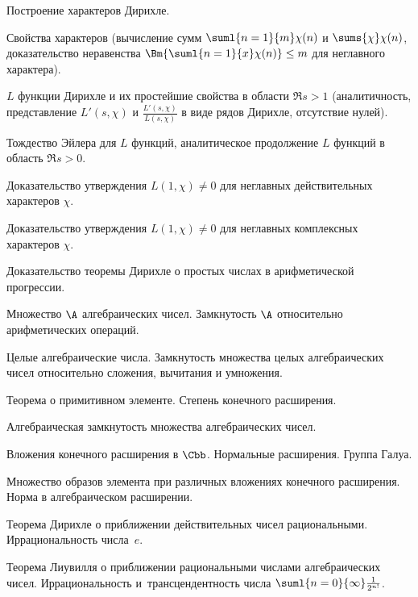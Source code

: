 \documentclass[a4paper]{article}
\begin{document}
\begin{nums}{-3.2}
\item Построение характеров Дирихле.

\item Свойства характеров (вычисление сумм $\suml{n = 1}{m}\chi(n)$ и
$\sums{\chi}\chi (n)$, доказательство неравенства
$\Bm{\suml{n = 1}{x} \chi (n)} \le m$ для неглавного характера).

\item  $L$ функции Дирихле и их простейшие свойства в области $\Re s > 1$
(аналитичность, представление $L'(s,\chi)$ и $\frac{L'(s,\chi)}{L(s,\chi)}$
в виде рядов Дирихле, отсутствие нулей).

\item  Тождество Эйлера для $L$ функций, аналитическое продолжение $L$ функций в
область $\Re s > 0$.

\item  Доказательство утверждения $L(1,\chi) \ne 0$ для неглавных
действительных характеров $\chi$.

\item  Доказательство утверждения $L(1,\chi) \ne 0$ для неглавных комплексных
характеров $\chi$.

\item  Доказательство теоремы Дирихле о простых числах в арифметической
прогрессии.

\item  Множество $\A$ алгебраических чисел. Замкнутость $\A$ относительно арифметических операций.

\item  Целые алгебраические числа. Замкнутость множества целых алгебраических
чисел относительно сложения, вычитания и умножения.

\item  Теорема о примитивном элементе. Степень конечного расширения.

\item  Алгебраическая замкнутость множества алгебраических чисел.

\item  Вложения конечного расширения в $\Cbb$. Нормальные расширения.
Группа Галуа.

\item  Множество образов элемента при различных вложениях
конечного расширения. Норма в алгебраическом расширении.

\item  Теорема Дирихле о приближении действительных чисел рациональными.
Иррациональность числа~$e$.

\item  Теорема Лиувилля о приближении рациональными числами алгебраических
чисел. Иррациональность и~трансцендентность числа $\suml{n =0}{\infty} \frac{1}{2^{n!}}$.


\end{nums}
\end{document}
